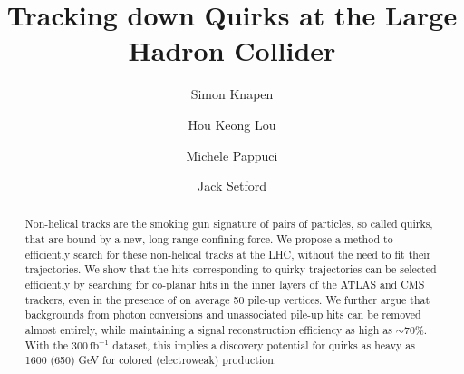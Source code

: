 \documentclass[10pt,aps,prd,nofootinbib,superscriptaddress,twocolumn,preprintnumbers,balancelastpage]{revtex4}
\newcommand{\gaga}{{\gamma\gamma}}
\begin{document}
\newcommand{\toname}{{\sqrt{s^{c}_{\gaga}}}}

\newcommand{\ion}{{\textrm{ion}}}
\newcommand{\Nu}{{\textrm{nu}}}
\newcommand{\GeV}{{\rm GeV}}
\newcommand{\TeV}{{\rm TeV}}
\newcommand{\fm}{{\rm fm}}
\renewcommand{\max}{{\rm max}}
\newcommand{\cm}{{\rm cm}}

\graphicspath{{Figures/}}

\title{
Tracking down Quirks at the Large Hadron Collider  
}

\author{Simon Knapen}
\author{Hou Keong Lou}
\author{Michele Pappuci}
\author{Jack Setford}


\begin{abstract}
 Non-helical tracks are the smoking gun signature of pairs of particles, so called quirks, that are bound by a new, long-range confining force. We propose a method to efficiently search for these non-helical tracks at the LHC, without the need to fit their trajectories. We show that the hits corresponding to quirky trajectories can be selected efficiently by searching for co-planar hits in the inner layers of the ATLAS and CMS trackers, even in the presence of on average 50 pile-up vertices. We further argue that backgrounds from photon conversions and unassociated pile-up  hits can be removed almost entirely, while maintaining a signal reconstruction efficiency as high as $\sim$70\%. With the $300\, \text{fb}^{-1}$ dataset, this implies a discovery potential for quirks as heavy as 1600 (650) GeV for colored (electroweak) production.
 
%
\end{abstract}
\end{document}
